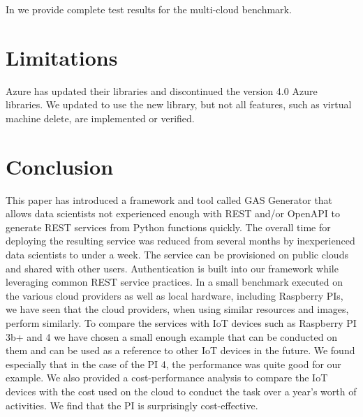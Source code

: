In  we provide complete test results for the multi-cloud benchmark.

\section{Limitations}\label{limitations}

Azure has updated their libraries and discontinued the version 4.0 Azure
libraries. We updated \Cloudmesh to use the new library, but not all
features, such as virtual machine delete, are implemented or verified.

\section{Conclusion}
\label{sec:conclusion}

This paper has introduced a framework and tool called GAS Generator
that allows data scientists not experienced enough with REST and/or
OpenAPI to generate REST services from Python functions quickly. The
overall time for deploying the resulting service was reduced from
several months by inexperienced data scientists to under a week. The
service can be provisioned on public clouds and shared with other
users. Authentication is built into our framework while leveraging
common REST service practices.  In a small benchmark executed on the
various cloud providers as well as local hardware, including Raspberry
PIs, we have seen that the cloud providers, when using similar
resources and images, perform similarly. To compare the services with
IoT devices such as Raspberry PI 3b+ and 4 we have chosen a small
enough example that can be conducted on them and can be used as a
reference to other IoT devices in the future. We found especially that
in the case of the PI 4, the performance was quite good for our
example. We also provided a cost-performance analysis to compare the
IoT devices with the cost used on the cloud to conduct the task over a
year's worth of activities. We find that the PI is surprisingly
cost-effective.

